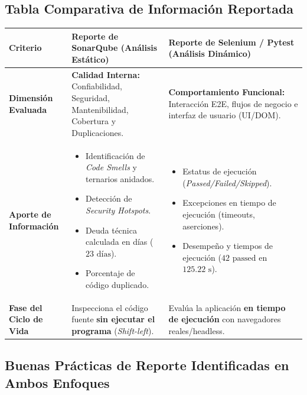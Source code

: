 \documentclass[12pt,a4paper]{article}
\begin{document}
\subsection*{\color{secondary} Tabla Comparativa de Información Reportada}

\begin{table}[h!]
\centering
\small
\renewcommand{\arraystretch}{1.4}
\begin{tabularx}{\textwidth}{>{\bfseries\color{primary}}p{3cm} X X}
\toprule
\rowcolor{}
\textbf{Criterio} & \textbf{Reporte de SonarQube (Análisis Estático)} & \textbf{Reporte de Selenium / Pytest (Análisis Dinámico)} \\
\midrule
Dimensión Evaluada & 
\textbf{Calidad Interna:} Confiabilidad, Seguridad, Mantenibilidad, Cobertura y Duplicaciones. & 
\textbf{Comportamiento Funcional:} Interacción E2E, flujos de negocio e interfaz de usuario (UI/DOM). \\
\hline
Aporte de Información & 
\begin{itemize}[leftmargin=*,noitemsep,topsep=0pt]
    \item Identificación de \textit{Code Smells} y ternarios anidados.
    \item Detección de \textit{Security Hotspots}.
    \item Deuda técnica calculada en días ($23\text{ días}$).
    \item Porcentaje de código duplicado.
\end{itemize} & 
\begin{itemize}[leftmargin=*,noitemsep,topsep=0pt]
    \item Estatus de ejecución (\textit{Passed/Failed/Skipped}).
    \item Excepciones en tiempo de ejecución (timeouts, aserciones).
    \item Desempeño y tiempos de ejecución ($42\text{ passed}$ en $125.22\text{ s}$).
\end{itemize} \\
\hline
Fase del Ciclo de Vida & 
Inspecciona el código fuente \textbf{sin ejecutar el programa} (\textit{Shift-left}). & 
Evalúa la aplicación \textbf{en tiempo de ejecución} con navegadores reales/headless. \\
\bottomrule
\end{tabularx}
\end{table}

\vspace{0.3cm}

\subsection*{\color{secondary} Buenas Prácticas de Reporte Identificadas en Ambos Enfoques}
\end{document}

